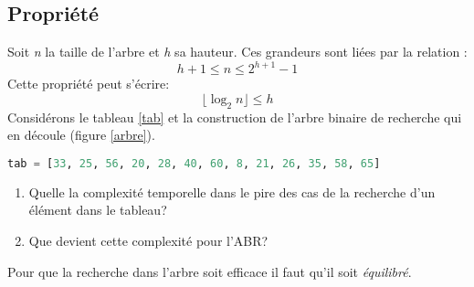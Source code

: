 \documentclass[a4paper,11pt]{article}
\begin{document}
\subsection{Propriété}
Soit \emph{n} la taille de l'arbre et \emph{h} sa hauteur. Ces grandeurs sont liées par la relation :
$$h+1 \leq n \leq 2^{h+1}-1$$
Cette propriété peut s'écrire:
$$ \lfloor \log_2 n  \rfloor \leq h$$
Considérons le tableau \ref{tab} et la construction de l'arbre binaire de recherche qui en découle (figure \ref{arbre}).
\begin{center}
    \begin{lstlisting}[language=Python]
tab = [33, 25, 56, 20, 28, 40, 60, 8, 21, 26, 35, 58, 65]
\end{lstlisting}
    \label{tab}
\end{center}
\begin{activite}
    \begin{enumerate}
        \item Quelle la complexité temporelle dans le pire des cas de la recherche d'un élément dans le tableau?
        \item Que devient cette complexité pour l'ABR?
    \end{enumerate}
\end{activite}
\begin{aretenir}[Remarque]
    Pour que la recherche dans l'arbre soit efficace il faut qu'il soit \emph{équilibré}.
\end{aretenir}
\end{document}
